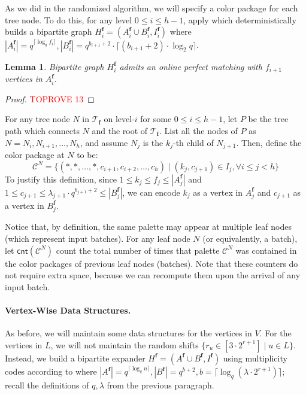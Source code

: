 \documentclass[11pt,a4paper]{article}
\newtheorem{lemma}{Lemma}[section]
\newcommand{\ceil}[1]{\lceil #1 \rceil}
\newcommand{\tree}{\mathcal{T}}
\newcommand{\freq}{\mathbf{f}}
\newcommand{\clr}{\mathcal{C}}
\newcommand{\cnt}{\mathsf{cnt}}
\begin{document}
As we did in the randomized algorithm, we will specify a color package for each tree node. To do this, for any level $0\leq i\leq h-1$, apply  which deterministically builds a bipartite graph $H_i^\freq = (A_i^\freq\cup B_i^\freq, I_i^\freq)$ where $|A_i^\freq| = q^{\ceil{\log_q f_i}}, |B_i^\freq| = q^{b_{i+1}+2}\cdot \ceil{(b_{i+1}+2)\cdot \log_2q}$.

\begin{lemma}\label{verify-perfect}
    Bipartite graph $H_i^\freq$ admits an online perfect matching with $f_{i+1}$ vertices in $A_i^\freq$.
\end{lemma}
\begin{proof}\textcolor{red}{TOPROVE 13}\end{proof}

For any tree node $N$ in $\tree_\freq$ on level-$i$ for some $0\leq i\leq h-1$, let $P$ be the tree path which connects $N$ and the root of $\tree_{\freq}$. List all the nodes of $P$ as $N = N_i, N_{i+1}, \ldots, N_h$, and assume $N_j$ is the $k_j$-th child of $N_{j+1}$. Then, define the color package at $N$ to be:
$$\clr^N = \{(*, *, \ldots, *, c_{i+1}, c_{i+2}, \ldots, c_h)\mid (k_j, c_{j+1})\in I_j, \forall i\leq j < h\}$$
To justify this definition, since $1\leq k_j\leq f_j\leq |A_j^\freq|$ and $1\leq c_{j+1}\leq \lambda_{j+1}\cdot q^{b_{j+1}+2}\leq |B_j^\freq|$, we can encode $k_j$ as a vertex in $A_j^\freq$ and $c_{j+1}$ as a vertex in $B_j^\freq$.

Notice that, by definition, the same palette may appear at multiple leaf nodes (which represent input batches). For any leaf node $N$ (or equivalently, a batch), let $\cnt(\clr^N)$ count the total number of times that palette $\clr^N$ was contained in the color packages of previous leaf nodes (batches). Note that these counters do not require extra space, because we can recompute them upon the arrival of any input batch.

\paragraph*{Vertex-Wise Data Structures.} As before, we will maintain some data structures for the vertices in $V$. For the vertices in $L$, we will not maintain the random shifts $\{r_u\in [3\cdot 2^{r+1}] \mid u\in L\}$. Instead, we build a bipartite expander $H^\freq = (A^\freq\cup B^\freq, I^\freq)$ using multiplicity codes according to  where $|A^\freq| = q^{\ceil{\log_q n}}, |B^\freq| = q^{b+2}, b = \ceil{\log_q(\lambda\cdot 2^{r+1})}$; recall the definitions of $q, \lambda$ from the previous paragraph.
\end{document}
